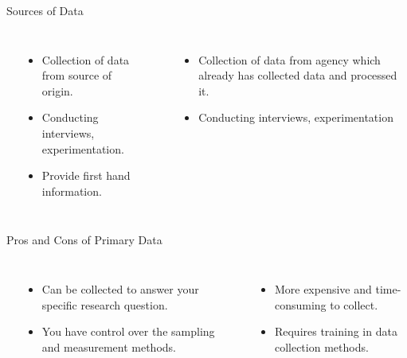 \begin{frame}[t]{Sources of Data}
\begin{columns}[T]
	 \\ 
	\begin{itemize}
		\item Collection of data from source of origin.
		\item Conducting interviews, experimentation.
		\item Provide first hand information.
	\end{itemize}
    \\ 
  \begin{itemize}
  	\item Collection of data from agency which already has collected data and 
  	processed it.
  	\item Conducting interviews, experimentation
  \end{itemize}
\end{columns}
\end{frame}


\begin{frame}[t]{Pros and Cons of Primary Data}
	\begin{columns}[T]
		 \\ 
		\begin{itemize}
			\item Can be collected to answer your specific research question.
			\item You have control over the sampling and measurement methods.
		\end{itemize}
		 \\ 
		\begin{itemize}
			\item More expensive and time-consuming to collect.
			\item Requires training in data collection methods.
		\end{itemize}
	\end{columns}
\end{frame}


